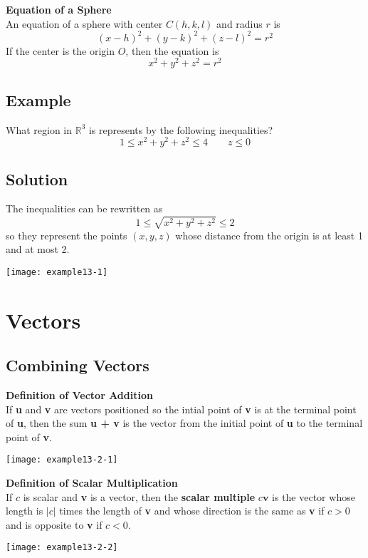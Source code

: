 \textbf{Equation of a Sphere} \\
An equation of a sphere with center $C(h,k,l)$ and radius $r$ is
$$ (x-h)^2+(y-k)^2+(z-l)^2=r^2 $$
If the center is the origin $O$, then the equation is
$$ x^2+y^2+z^2=r^2 $$

\subsection*{Example}
What region in $\mathbb{R}^3$ is represents by the following inequalities?
$$1\leq x^2+y^2+z^2\leq 4 \qquad z\leq 0$$
\subsection*{Solution}
The inequalities can be rewritten as
$$1\leq \sqrt{x^2+y^2+z^2}\leq 2$$
so they represent the points $(x,y,z)$ whose distance from the origin is at least 1 and at most 2.
\begin{center}
    \texttt{[image: example13-1]}
\end{center}

\section{Vectors}

\subsection*{Combining Vectors}
\textbf{Definition of Vector Addition} \\
If \textbf{u} and \textbf{v} are vectors positioned
so the intial point of \textbf{v} is at the terminal point of \textbf{u}, then
the sum \textbf{u + v} is the vector from the initial point of \textbf{u}
to the terminal point of \textbf{v}.
\begin{center}
    \texttt{[image: example13-2-1]}
\end{center}

\textbf{Definition of Scalar Multiplication} \\
If $c$ is scalar and \textbf{v} is a vector, then the \textbf{scalar multiple}
$c\mathbf{v}$ is the vector whose length is $|c|$ times the length of
\textbf{v} and whose direction is the same as \textbf{v} if $c>0$ and
is opposite to \textbf{v} if $c<0$.
\begin{center}
    \texttt{[image: example13-2-2]}
\end{center}


